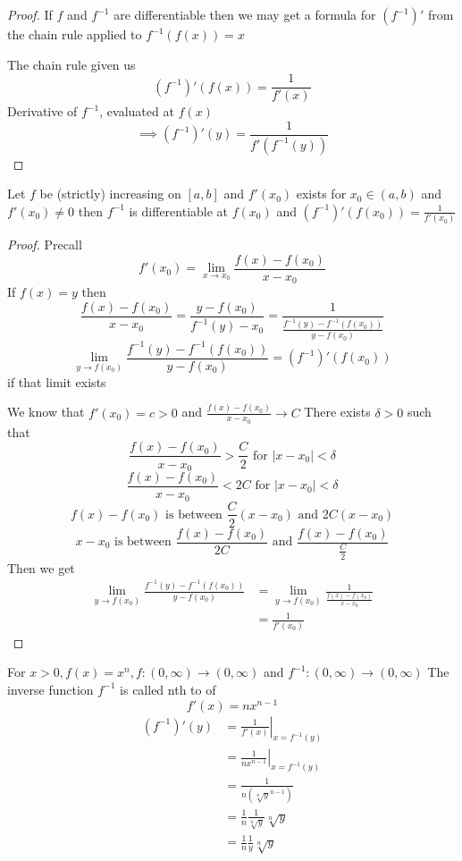 \begin{proof}
  If $f$ and $f^{-1}$ are differentiable then we may get a formula for $(f^{-1})'$ from the chain rule applied to $f^{-1}(f(x)) = x$

  The chain rule given us
  $$(f^{-1})'(f(x)) = \frac{1}{f'(x)}$$
  Derivative of $f^{-1}$, evaluated at $f(x)$
  $$\implies (f^{-1})'(y) = \frac{1}{f'(f^{-1}(y))}$$
\end{proof}

\begin{theorem*}
  Let $f$ be (strictly) increasing on $[a, b]$ and $f'(x_0)$ exists for $x_0 \in (a, b)$ and $f'(x_0) \neq 0$ then $f^{-1}$ is differentiable at $f(x_0)$
  and $(f^{-1})'(f(x_0)) = \frac{1}{f'(x_0)}$
\end{theorem*}

\begin{proof}
  Precall $$f'(x_0) = \lim\limits_{x \to x_0}\frac{f(x) - f(x_0)}{x-x_0}$$
  If $f(x) = y$ then $$\frac{f(x) - f(x_0)}{x-x_0} = \frac{y-f(x_0)}{f^{-1}(y) - x_0} = \frac{1}{\frac{f^{-1}(y) - f^{-1}(f(x_0))}{y-f(x_0)}}$$
  $$\lim\limits_{y \to f(x_0)}\frac{f^{-1}(y) - f^{-1}(f(x_0))}{y - f(x_0)} = (f^{-1})'(f(x_0))$$
  if that limit exists

  We know that $f'(x_0) = c > 0$ and $\frac{f(x) - f(x_0)}{x - x_0} \to C$
  There exists $\delta > 0$ such that 
  $$\frac{f(x) - f(x_0)}{x - x_0} > \frac{C}{2} \text{ for } |x - x_0| < \delta$$
  $$\frac{f(x) - f(x_0)}{x - x_0} < 2C \text{ for } |x - x_0| < \delta$$
  $$f(x) - f(x_0) \text{ is between } \frac{C}{2}(x - x_0) \text{ and } 2C(x-x_0)$$
  $$x - x_0 \text{ is between } \frac{f(x) - f(x_0)}{2C} \text{ and } \frac{f(x) - f(x_0)}{\frac{C}{2}}$$
  Then we get
  \begin{align*}
    \lim\limits_{y \to f(x_0)} \frac{f^{-1}(y) - f^{-1}(f(x_0))}{y - f(x_0)} &= \lim\limits_{y \to f(x_0)} \frac{1}{\frac{f(x) - f(x_0)}{x-x_0}}\\
    &= \frac{1}{f'(x_0)}
  \end{align*}
\end{proof}

\begin{example*}
  For $x > 0, f(x) = x^n, f:(0, \infty) \to (0, \infty)$ and $f^{-1}: (0, \infty) \to (0, \infty)$
  The inverse function $f^{-1}$ is called nth to of
  $$f'(x) = nx^{n-1}$$
  \begin{align*}
  (f^{-1})'(y) &= \left.\frac{1}{f'(x)} \right|_{x=f^{-1}(y)} \\
  &= \left.\frac{1}{nx^{n-1}}\right|_{x = f^{-1}(y)} \\
  &= \frac{1}{n(\sqrt[n]{y}^{n-1})} \\
  &= \frac{1}{n}\frac{1}{\sqrt[n]{y}}\sqrt[n]{y} \\
  &= \frac{1}{n}\frac{1}{y}\sqrt[n]{y}
  \end{align*}
\end{example*}


